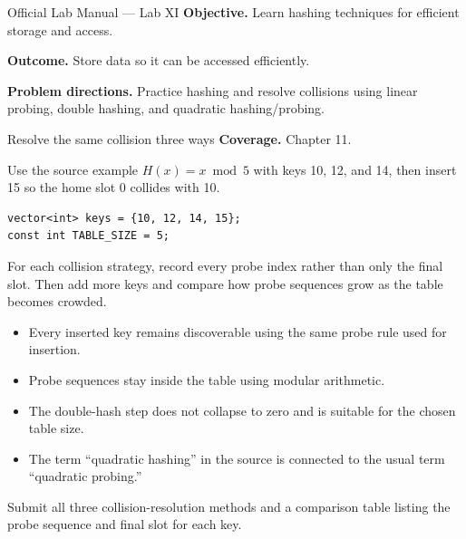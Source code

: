 
\begin{sourcealignment}{Official Lab Manual --- Lab XI}
\textbf{Objective.} Learn hashing techniques for efficient storage and access.

\textbf{Outcome.} Store data so it can be accessed efficiently.

\textbf{Problem directions.} Practice hashing and resolve collisions using linear probing, double hashing, and quadratic hashing/probing.
\end{sourcealignment}

\begin{labproject}{Resolve the same collision three ways}
\textbf{Coverage.} Chapter 11.

Use the source example $H(x)=x\bmod5$ with keys 10, 12, and 14, then insert 15 so the home slot 0 collides with 10.

\begin{lstlisting}
vector<int> keys = {10, 12, 14, 15};
const int TABLE_SIZE = 5;
\end{lstlisting}

\begin{tryit}
For each collision strategy, record every probe index rather than only the final slot. Then add more keys and compare how probe sequences grow as the table becomes crowded.
\end{tryit}
\end{labproject}

\begin{verification}
\begin{itemize}
  \item Every inserted key remains discoverable using the same probe rule used for insertion.
  \item Probe sequences stay inside the table using modular arithmetic.
  \item The double-hash step does not collapse to zero and is suitable for the chosen table size.
  \item The term ``quadratic hashing'' in the source is connected to the usual term ``quadratic probing.''
\end{itemize}
\end{verification}

\begin{labdeliverable}
Submit all three collision-resolution methods and a comparison table listing the probe sequence and final slot for each key.
\end{labdeliverable}
